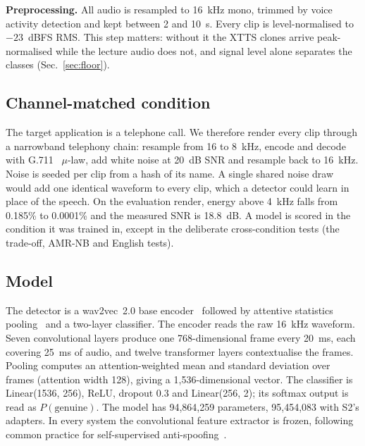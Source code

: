 \textbf{Preprocessing.} All audio is resampled to 16~kHz mono, trimmed by voice
activity detection and kept between 2 and 10~s. Every clip is level-normalised to
$-23$~dBFS RMS. This step matters: without it the XTTS clones arrive
peak-normalised while the lecture audio does not, and signal level alone separates
the classes (Sec.~\ref{sec:floor}).

\subsection{Channel-matched condition}
\label{sec:channel}

The target application is a telephone call. We therefore render every clip through a
narrowband telephony chain: resample from 16 to 8~kHz, encode and decode with G.711~\cite{itu1988g711}
$\mu$-law, add white noise at 20~dB SNR and resample back to 16~kHz. Noise is seeded
per clip from a hash of its name. A single shared noise draw would add one identical
waveform to every clip, which a detector could learn in place of the speech. On the
evaluation render, energy above 4~kHz falls from 0.185\% to 0.0001\% and the measured
SNR is 18.8~dB. A model is scored in the condition it was trained in, except in the
deliberate cross-condition tests (the trade-off, AMR-NB and English tests).

\subsection{Model}
\label{sec:model}

The detector is a wav2vec~2.0 base encoder~\cite{baevski2020wav2vec} followed by
attentive statistics pooling~\cite{okabe2018attentive} and a two-layer classifier.
The encoder reads the raw 16~kHz waveform. Seven convolutional layers produce one
768-dimensional frame every 20~ms, each covering 25~ms of audio, and twelve
transformer layers contextualise the frames. Pooling computes an attention-weighted
mean and standard deviation over frames (attention width 128), giving a
1{,}536-dimensional vector. The classifier is Linear(1536, 256), ReLU, dropout 0.3 and
Linear(256, 2); its softmax output is read as $P(\text{genuine})$. The model has
94{,}864{,}259 parameters, 95{,}454{,}083 with S2's adapters. In every system the convolutional feature extractor is
frozen, following common practice for self-supervised
anti-spoofing~\cite{tak2022wav2vec}.

